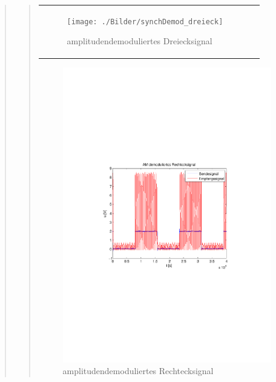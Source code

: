 \begin{quote}
\begin{quote}
\begin{center}
\begin{tabular}{ll}
\begin{minipage}{0.6\textwidth}
                \end{minipage}
                \begin{minipage}{0.6\textwidth}

                     \begin{figure}[H]
                        \label{fig:}
                        \texttt{[image: ./Bilder/synchDemod\_dreieck]} %
                        \caption{amplitudendemoduliertes Dreiecksignal}
                    \end{figure}
               \vspace{-1.5em}

                \end{minipage}

            \end{tabular}
            \end{center}
            
             \begin{figure}[H] \centering
                    \includegraphics[scale=0.5, trim = 2cm 6.5cm 1.5cm 8.5cm,
                    clip]{./Bilder/synchDemod_rechteck}
                        \caption{amplitudendemoduliertes Rechtecksignal}
                \end{figure}
                

\end{quote}
\end{quote}
